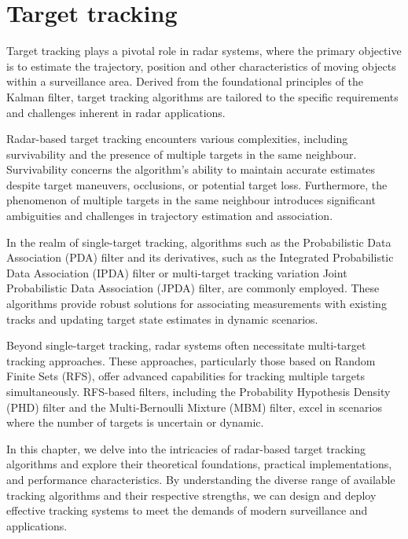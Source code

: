 
\chapter{Target tracking}
Target tracking plays a pivotal role in radar systems, where the primary objective is to estimate the trajectory,
position and other
characteristics of moving objects within a surveillance area. Derived from the foundational principles of the Kalman filter, target tracking algorithms are tailored to the specific requirements and challenges inherent in radar applications.

Radar-based target tracking encounters various complexities, including survivability and the presence of
multiple targets in the same neighbour. Survivability concerns the algorithm's ability to maintain
accurate estimates despite target maneuvers, occlusions, or potential target loss. Furthermore, the phenomenon of
multiple targets in the same neighbour introduces significant ambiguities and challenges in trajectory estimation and
association.

In the realm of single-target tracking, algorithms such as the Probabilistic Data Association (PDA) filter and its
derivatives, such as the Integrated
Probabilistic Data Association (IPDA) filter or multi-target tracking variation Joint Probabilistic Data Association (JPDA)
filter, are commonly
employed. These algorithms provide robust solutions for associating measurements with existing tracks and updating target state estimates in dynamic scenarios.

Beyond single-target tracking, radar systems often necessitate multi-target tracking approaches. These approaches,
particularly those based on Random Finite Sets (RFS), offer advanced capabilities for tracking multiple targets simultaneously. RFS-based filters, including the Probability Hypothesis Density (PHD) filter and the Multi-Bernoulli Mixture (MBM) filter, excel in scenarios where the number of targets is uncertain or dynamic.

In this chapter, we delve into the intricacies of radar-based target tracking algorithms and explore their theoretical foundations, practical implementations, and performance characteristics. By understanding the diverse range of available tracking algorithms and their respective strengths, we can design and deploy effective tracking systems to meet the demands of modern surveillance and applications.

